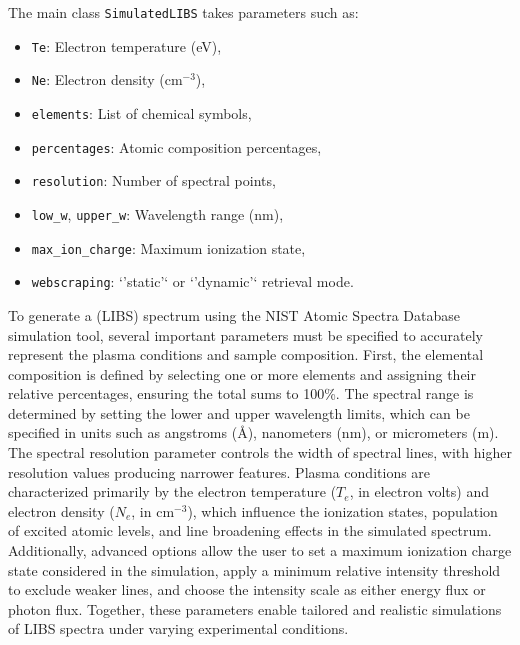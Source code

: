 \documentclass[12pt,a4paper]{article}
\begin{document}
	The main class \texttt{SimulatedLIBS} takes parameters such as:
	\begin{itemize}
		\item \texttt{Te}: Electron temperature (eV),
		\item \texttt{Ne}: Electron density (cm$^{-3}$),
		\item \texttt{elements}: List of chemical symbols,
		\item \texttt{percentages}: Atomic composition percentages,
		\item \texttt{resolution}: Number of spectral points,
		\item \texttt{low\_w}, \texttt{upper\_w}: Wavelength range (nm),
		\item \texttt{max\_ion\_charge}: Maximum ionization state,
		\item \texttt{webscraping}: `'static'` or `'dynamic'` retrieval mode.
	\end{itemize}
	To generate a (LIBS) spectrum using the NIST Atomic Spectra Database simulation tool, several important parameters must be specified to accurately represent the plasma conditions and sample composition. First, the elemental composition is defined by selecting one or more elements and assigning their relative percentages, ensuring the total sums to 100\%. The spectral range is determined by setting the lower and upper wavelength limits, which can be specified in units such as angstroms (\AA), nanometers (nm), or micrometers (\textmu m). The spectral resolution parameter controls the width of spectral lines, with higher resolution values producing narrower features. Plasma conditions are characterized primarily by the electron temperature ($T_e$, in electron volts) and electron density ($N_e$, in cm$^{-3}$), which influence the ionization states, population of excited atomic levels, and line broadening effects in the simulated spectrum. Additionally, advanced options allow the user to set a maximum ionization charge state considered in the simulation, apply a minimum relative intensity threshold to exclude weaker lines, and choose the intensity scale as either energy flux or photon flux. Together, these parameters enable tailored and realistic simulations of LIBS spectra under varying experimental conditions.
	
\end{document}
